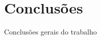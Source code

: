 \documentclass[twoside,conference,a4paper]{IEEEtran}
\begin{document}
\section{Conclusões}

Conclusões gerais do trabalho









\vspace{20ex}

\vspace{3ex}
\end{document}
